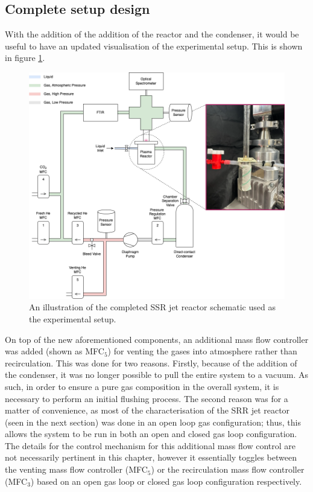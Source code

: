 \subsection{Complete setup design}

With the addition of the addition of the reactor and the condenser, it would be useful to have an updated visualisation of the experimental setup. This is shown in figure \ref{fig:complete_reactor_schematic}. 

\begin{figure}[h!]
	\centering
    \includegraphics[width=\linewidth]{chapter_6/figures/reactor_schematic.png} 
	\caption{An illustration of the completed SSR jet reactor schematic used as the experimental setup.}
	\label{fig:complete_reactor_schematic}
\end{figure} 

On top of the new aforementioned components, an additional mass flow controller was added (shown as MFC$_5$) for venting the gases into atmosphere rather than recirculation. This was done for two reasons. Firstly, because of the addition of the condenser, it was no longer possible to pull the entire system to a vacuum. As such, in order to ensure a pure gas composition in the overall system, it is necessary to perform an initial flushing process. The second reason was for a matter of convenience, as most of the characterisation of the SRR jet reactor (seen in the next section) was done in an open loop gas configuration; thus, this allows the system to be run in both an open and closed gas loop configuration. The details for the control mechanism for this additional mass flow control are not necessarily pertinent in this chapter, however it essentially toggles between the venting mass flow controller (MFC$_5$) or the recirculation mass flow controller (MFC$_3$) based on an open gas loop or closed gas loop configuration respectively.


